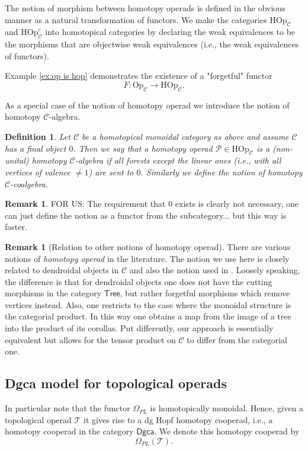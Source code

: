 \documentclass[a4paper]{amsart}
\theoremstyle{plain}
\newtheorem{defi}[thm]{Definition}
\theoremstyle{definition}
\newtheorem{rem}[thm]{Remark}
\newcommand{\op}{\mathcal}
\newcommand{\dgca}{\mathsf{Dgca}}
\newcommand{\mC}{{\mathcal{C}}}
\newcommand{\Hop}{{\mathrm{HOp}}}
\newcommand{\Op}{{\mathrm{Op}}}
\newcommand{\Tree}{{\mathsf{Tree}}}
\begin{document}
The notion of morphism between homotopy operads is defined in the obvious manner as a natural transformation of functors.
We make the categories $\Hop_\mC$ and $\Hop_{\mC}^c$ into homotopical categories by declaring the weak equivalences to be the morphisms that are objectwise weak equivalences (i.e., the weak equivalences of functors).


Example \ref{ex:op is hop} demonstrates the existence of a "forgetful" functor
\[
F : \Op_\mC \to \Hop_\mC.
\]

As a special case of the notion of homotopy operad we introduce the notion of homotopy $\mC$-algebra.
\begin{defi}
 Let $\mC$ be a homotopical monoidal category as above and assume $\mC$ has a final object $0$.
Then we say that a homotopy operad $\op P\in \Hop_\mC$ is a (non-unital) homotopy $\mC$-algebra if all forests except the linear ones (i.e., with all vertices of valence $\neq 1$) are sent to $0$.
Similarly we define the notion of homotopy $\mC$-coalgebra.
\end{defi}
\begin{rem}
 FOR US: The requirement that 0 exists is clearly not necessary, one can just define the notion as a functor from the subcategory... but this way is faster.
\end{rem}


\begin{rem}[Relation to other notions of homotopy operad]
There are various notions of \emph{homotopy operad} in the literature. The notion we use here is closely related to dendroidal objects in $\mC$ \cite{MW} and also the notion used in \cite{Ho}.
Loosely speaking, the difference is that for dendroidal objects one does not have the cutting morphisms in the category $\Tree$, but rather forgetful morphisms which remove vertices instead.
Also, one restricts to the case where the monoidal structure is the categorial product.
In this way one obtains a map from the image of a tree into the product of its corollas.
Put differently, our approach is essentially equivalent but allows for the tensor product on $\mC$ to differ from the categorial one.
\end{rem}

\subsection{Dgca model for topological operads}\label{sec:dgca mod for op}
In particular note that the functor $\Omega_{PL}$ is homotopically monoidal.
Hence, given a topological operad $\op T$ it gives rise to a dg Hopf homotopy cooperad, i.e., a homotopy cooperad in the category $\dgca$. We denote this homotopy cooperad by
\[
 \Omega_{PL}(\op T).
\]
\end{document}
